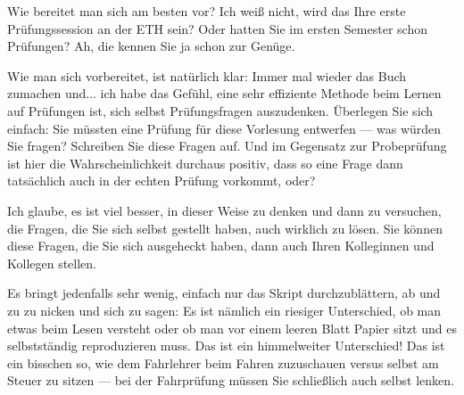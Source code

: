 \begin{ai-global-state-checkpoint-invisible-content}
\end{ai-global-state-checkpoint-invisible-content}

\begin{spoken-clean}[01:23:09 - 01:25:39]
Wie bereitet man sich am besten vor? Ich weiß nicht, wird das Ihre erste Prüfungssession an der ETH sein? Oder hatten Sie im ersten Semester schon Prüfungen? Ah, die kennen Sie ja schon zur Genüge.

Wie man sich vorbereitet, ist natürlich klar: Immer mal wieder das Buch zumachen und... ich habe das Gefühl, eine sehr effiziente Methode beim Lernen auf Prüfungen ist, sich selbst Prüfungsfragen auszudenken. Überlegen Sie sich einfach: Sie müssten eine Prüfung für diese Vorlesung entwerfen --- was würden Sie fragen? Schreiben Sie diese Fragen auf. Und im Gegensatz zur Probeprüfung ist hier die Wahrscheinlichkeit durchaus positiv, dass so eine Frage dann tatsächlich auch in der echten Prüfung vorkommt, oder?

Ich glaube, es ist viel besser, in dieser Weise zu denken und dann zu versuchen, die Fragen, die Sie sich selbst gestellt haben, auch wirklich zu lösen. Sie können diese Fragen, die Sie sich ausgeheckt haben, dann auch Ihren Kolleginnen und Kollegen stellen.

Es bringt jedenfalls sehr wenig, einfach nur das Skript durchzublättern, ab und zu zu nicken und sich zu sagen:  Es ist nämlich ein riesiger Unterschied, ob man etwas beim Lesen versteht oder ob man vor einem leeren Blatt Papier sitzt und es selbstständig reproduzieren muss. Das ist ein himmelweiter Unterschied! Das ist ein bisschen so, wie dem Fahrlehrer beim Fahren zuzuschauen versus selbst am Steuer zu sitzen --- bei der Fahrprüfung müssen Sie schließlich auch selbst lenken.
\end{spoken-clean}


